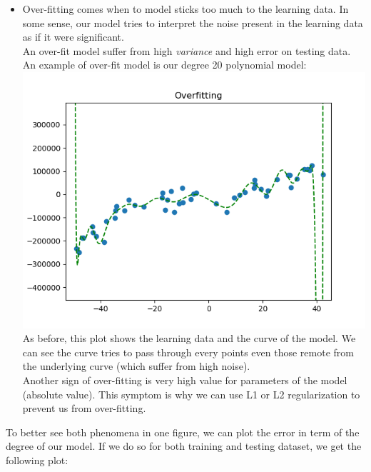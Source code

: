 \documentclass[a4paper, 10pt]{article}
\begin{document}
\begin{itemize}[label=$\square$]
    \item Over-fitting comes when to model sticks too much to the learning data. In some sense, 
    our model tries to interpret the noise present in the learning data as if it were significant.
    \\
    An over-fit model suffer from high \emph{variance} and high error on testing data.
    \\
    An example of over-fit model is our degree 20 polynomial model:
    \\
    \includegraphics[scale=0.7]{ex1a_over}
    \\
    As before, this plot shows the learning data and the curve of the model.
    We can see the curve tries to pass through every points even those remote from the underlying
    curve (which suffer from high noise).
    \\ 
    Another sign of over-fitting is very high value for parameters of the model (absolute value). 
    This symptom is why we can use L1 or L2 regularization to prevent us from over-fitting.
\end{itemize}
To better see both phenomena in one figure, we can plot the error in term of the degree of our model.
If we do so for both training and testing dataset, we get the following plot:
\\
\end{document}
